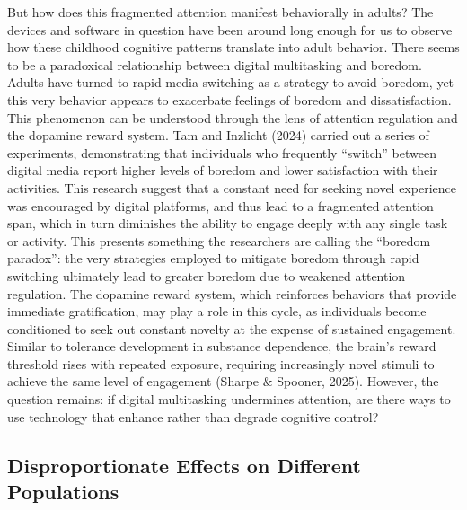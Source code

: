 \documentclass[12pt,letterpaper]{article}
\begin{document}
But how does this fragmented attention manifest behaviorally in adults? The devices and software in question have been around long enough for us to observe how these childhood cognitive patterns translate into adult behavior. There seems to be a paradoxical relationship between digital multitasking and boredom. Adults have turned to rapid media switching as a strategy to avoid boredom, yet this very behavior appears to exacerbate feelings of boredom and dissatisfaction. This phenomenon can be understood through the lens of attention regulation and the dopamine reward system. Tam and Inzlicht (2024) carried out a series of experiments, demonstrating that individuals who frequently ``switch'' between digital media report higher levels of boredom and lower satisfaction with their activities. This research suggest that a constant need for seeking novel experience was encouraged by digital platforms, and thus lead to a fragmented attention span, which in turn diminishes the ability to engage deeply with any single task or activity. This presents something the researchers are calling the ``boredom paradox'': the very strategies employed to mitigate boredom through rapid switching ultimately lead to greater boredom due to weakened attention regulation. The dopamine reward system, which reinforces behaviors that provide immediate gratification, may play a role in this cycle, as individuals become conditioned to seek out constant novelty at the expense of sustained engagement. Similar to tolerance development in substance dependence, the brain's reward threshold rises with repeated exposure, requiring increasingly novel stimuli to achieve the same level of engagement (Sharpe \& Spooner, 2025). However, the question remains: if digital multitasking undermines attention, are there ways to use technology that enhance rather than degrade cognitive control?

\subsection*{Disproportionate Effects on Different Populations}
\end{document}
